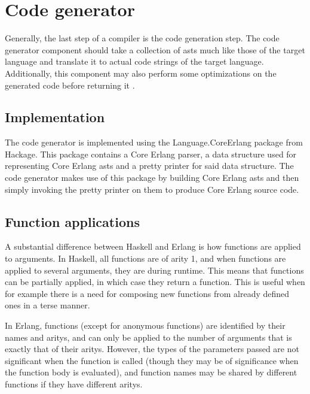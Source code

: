 \section{Code generator}

Generally, the last step of a compiler is the code generation step. The code generator
component should take a collection of \glspl{ast} much like those of the target language and translate it to actual code strings of the target language. Additionally, this component may also 
perform some optimizations on the generated code before returning it .

\subsection{Implementation}

The code generator is implemented using the Language.CoreErlang  \cite{CoreErlang} package from Hackage. %
This package contains a Core Erlang parser, a data structure  used for representing Core Erlang \glspl{ast} and a pretty printer for said data structure. The code generator makes use of this package by building Core Erlang \glspl{ast} and then simply invoking the pretty printer on them to produce Core Erlang source code.

\subsection{Function applications}


A substantial difference between Haskell and Erlang is how functions are applied to arguments. In Haskell, all functions are of \gls{arity} 1, and when functions are applied to several arguments, they are  during runtime. This means that functions can be partially applied, in which case they return a function. This is useful when for example there is a need for composing new functions from already defined ones in a terse manner.

In Erlang, functions (except for anonymous functions) are identified by their names and \glspl{arity}, and can only be applied to the number of arguments that is exactly that of their \glspl{arity}. However, the types of the parameters passed are not significant when the function is called (though they may be of significance when the function body is evaluated), and function names may be shared by different functions if they have different \glspl{arity}.

